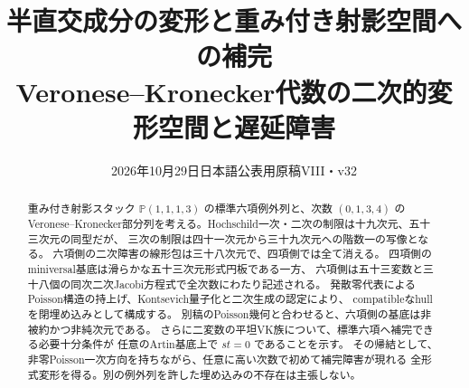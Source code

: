 
\title{半直交成分の変形と重み付き射影空間への補完\\
\large Veronese--Kronecker代数の二次的変形空間と遅延障害}
\author{}\date{2026年10月29日\quad 日本語公表用原稿VIII・v32}
\maketitle
\begin{abstract}
重み付き射影スタック $\mathbb P(1,1,1,3)$ の標準六項例外列と、次数 $(0,1,3,4)$ の
Veronese--Kronecker部分列を考える。Hochschild一次・二次の制限は十九次元、五十三次元の同型だが、
三次の制限は四十一次元から三十九次元への階数一の写像となる。
六項側の二次障害の線形包は三十八次元で、四項側では全て消える。
四項側のminiversal基底は滑らかな五十三次元形式円板である一方、
六項側は五十三変数と三十八個の同次二次Jacobi方程式で全次数にわたり記述される。
発散零代表によるPoisson構造の持上げ、Kontsevich量子化と二次生成の認定により、
compatibleなhullを閉埋め込みとして構成する。
別稿のPoisson幾何と合わせると、六項側の基底は非被約かつ非純次元である。
さらに二変数の平坦VK族について、標準六項へ補完できる必要十分条件が
任意のArtin基底上で $st=0$ であることを示す。
その帰結として、非零Poisson一次方向を持ちながら、任意に高い次数で初めて補完障害が現れる
全形式変形を得る。別の例外列を許した埋め込みの不存在は主張しない。
\end{abstract}
\tableofcontents










